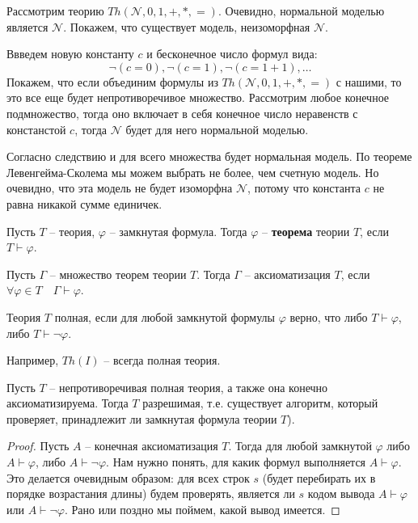 \begin{example}
    Рассмотрим теорию $Th(\mathcal{N}, 0, 1, +, *, =)$. Очевидно, нормальной моделью является $\mathcal{N}$. Покажем, что существует модель, неизоморфная $\mathcal{N}$.

    Ввведем новую константу $c$ и бесконечное число формул вида: \[ \lnot(c = 0), \lnot(c = 1), \lnot(c = 1 + 1), \dots \]
    Покажем, что если объединим формулы из $Th(\mathcal{N}, 0, 1, +, *, =)$ с нашими, то это все еще будет непротиворечивое множество. Рассмотрим любое конечное подмножество, тогда оно включает в себя конечное число неравенств с констанстой $c$, тогда $\mathcal{N}$ будет для него нормальной моделью.

    Согласно следствию и для всего множества будет нормальная модель. По теореме Левенгейма-Сколема мы можем выбрать не более, чем счетную модель. Но очевидно, что эта модель не будет изоморфна $\mathcal{N}$, потому что константа $c$ не равна никакой сумме единичек.
\end{example}

\begin{conj}
    Пусть $T$ -- теория, $\varphi$ -- замкнутая формула. Тогда $\varphi$ -- \textbf{теорема} теории $T$, если $T \vdash \varphi$.
\end{conj}
\begin{conj}
    Пусть $\Gamma$ -- множество теорем теории $T$. Тогда $\Gamma$ -- аксиоматизация $T$, если $\forall \varphi \in T \quad \Gamma \vdash \varphi$.
\end{conj}
\begin{conj}
    Теория $T$ полная, если для любой замкнутой формулы $\varphi$ верно, что либо $T \vdash \varphi$, либо $T \vdash \lnot \varphi$.
\end{conj}

Например, $Th(I)$ -- всегда полная теория. 

\begin{theorem}
    Пусть $T$ -- непротиворечивая полная теория, а также она конечно аксиоматизируема. Тогда $T$ разрешимая, т.е. существует алгоритм, который проверяет, принадлежит ли замкнутая формула теории $T$).
\end{theorem}
\begin{proof}
    Пусть $A$ -- конечная аксиоматизация $T$. Тогда для любой замкнутой $\varphi$ либо $A \vdash \varphi$, либо $A \vdash \lnot \varphi$. Нам нужно понять, для какик формул выполняется $A \vdash \varphi$. Это делается очевидным образом: для всех строк $s$ (будет перебирать их в порядке возрастания длины) будем проверять, является ли $s$ кодом вывода $A \vdash \varphi$ или $A \vdash \lnot \varphi$. Рано или поздно мы поймем, какой вывод имеется.
\end{proof}

